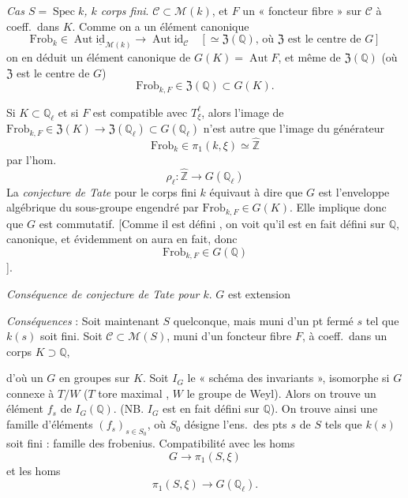 \documentclass[11pt,a4paper]{article}
\begin{document}
\emph{Cas $S = \operatorname{Spec} k$, $k$ corps fini}.
$\mathcal{C} \subset \mathcal{M}(k)$, et $F$ un « foncteur fibre » sur
$\mathcal{C}$ à coeff.\ dans $K$. Comme on a un élément canonique
\[
  \mathrm{Frob}_{k} \in \operatorname{Aut} \underline{\mathrm{id}}_{\mathcal{M}(k)}
  \longrightarrow \operatorname{Aut} \mathrm{id}_{\mathcal{C}}
  \quad [\simeq \mathfrak{Z}(\mathbb{Q}) \text{, où } \mathfrak{Z}
  \text{ est le centre de } G]
\]
on en déduit un élément canonique de $G(K) = \operatorname{Aut} F$, et même
de $\mathfrak{Z}(\mathbb{Q})$ (où $\mathfrak{Z}$ est le centre de $G$)
\[
  \boxed{\mathrm{Frob}_{k,F} \in \mathfrak{Z}(\mathbb{Q}) \subset G(K)} .
\]

Si $K \subset \mathbb{Q}_{\ell}$ et si $F$ est compatible avec
$T^{\ell}_{\xi}$, alors l'image de
$\mathrm{Frob}_{k,F} \in \mathfrak{Z}(K) \to \mathfrak{Z}(\mathbb{Q}_{\ell})
\subset G(\mathbb{Q}_{\ell})$  n'est autre que
l'image du générateur
\[
  \mathrm{Frob}_{k} \in \pi_{1}(k, \xi) \simeq \hat{\mathbb{Z}}
\]
par l'hom.
\[
  \rho_{\ell} : \hat{\mathbb{Z}} \longrightarrow G(\mathbb{Q}_{\ell})
\]
La \emph{conjecture de Tate} pour le corps fini $k$ équivaut à dire que $G$
est l'enveloppe algébrique du sous-groupe engendré par
$\mathrm{Frob}_{k,F} \in G(K)$. Elle implique donc que $G$ est commutatif.
[Comme il est défini  \ill{}, on voit qu'il est en fait
défini sur $\mathbb{Q}$, canonique, et évidemment on aura en fait, donc
\[
  \mathrm{Frob}_{k,F} \in G(\mathbb{Q})
\]
].

\emph{Conséquence de conjecture de Tate pour $k$}.
 $G$ est extension

\emph{Conséquences} : Soit maintenant $S$ quelconque, mais muni d'un pt
fermé $s$ tel que $k(s)$ soit fini. Soit $\mathcal{C} \subset \mathcal{M}(S)$,
\struck{\ill{}}  muni d'un
foncteur fibre $F$, à coeff.\ dans un corps $K \supset \mathbb{Q}$,

d'où un $G$  en groupes sur $K$. Soit $I_{G}$ le « schéma
des invariants », isomorphe si $G$ connexe à $T/W$ ($T$ tore maximal
\struck{\ill{}}, $W$ le groupe de Weyl). Alors on trouve un élément $f_{s}$
de $I_{G}(\mathbb{Q})$. (NB. $I_{G}$ est en fait défini sur $\mathbb{Q}$).
On trouve ainsi une famille d'éléments $(f_{s})_{s \in S_{0}}$, où $S_{0}$
désigne l'ens.\ des pts $s$ de $S$ tels que $k(s)$ soit fini : famille des
frobenius. Compatibilité avec les homs
\[
  G \longrightarrow \pi_{1}(S, \xi)
\]
et les homs
\[
  \pi_{1}(S, \xi) \longrightarrow G(\mathbb{Q}_{\ell}) .
\]
\end{document}
